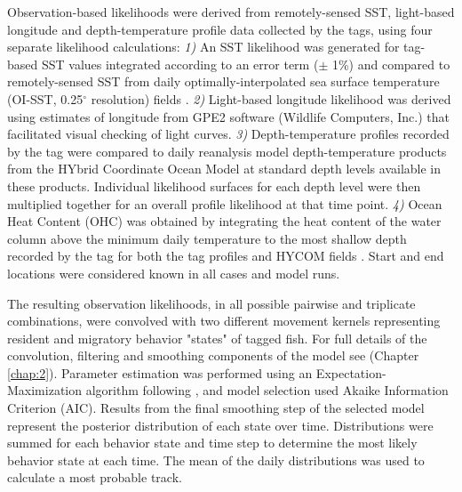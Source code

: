 Observation-based likelihoods were derived from remotely-sensed SST, light-based longitude and depth-temperature profile data collected by the tags, using four separate likelihood calculations: \emph{1)} An SST likelihood was generated for tag-based SST values integrated according to an error term (\(\pm\) 1\%) and compared to remotely-sensed SST from daily optimally-interpolated sea surface temperature (OI-SST, 0.25$^{\circ}$ resolution) fields \citep{Reynolds2007, Banzon2016}. \emph{2)} Light-based longitude likelihood was derived using estimates of longitude from GPE2 software (Wildlife Computers, Inc.) that facilitated visual checking of light curves. \emph{3)} Depth-temperature profiles recorded by the tag were compared to daily reanalysis model depth-temperature products from the HYbrid Coordinate Ocean Model \citep[HYCOM, 0.08$^{\circ}$ resolution;][]{Bleck2002, Chassignet2007} at standard depth levels available in these products. Individual likelihood surfaces for each depth level were then multiplied together for an overall profile likelihood at that time point. \emph{4)} Ocean Heat Content (OHC) was obtained by integrating the heat content of the water column above the minimum daily temperature to the most shallow depth recorded by the tag for both the tag profiles and HYCOM fields \citep{Luo2015, Braun2018a}. Start and end locations were considered known in all cases and model runs.

The resulting observation likelihoods, in all possible pairwise and triplicate combinations, were convolved with two different movement kernels representing resident and migratory behavior "states" of tagged fish. For full details of the convolution, filtering and smoothing components of the model see \citet{Braun2018a} (Chapter \ref{chap:2}). Parameter estimation was performed using an Expectation-Maximization algorithm following \citet{Woillez2016}, and model selection used Akaike Information Criterion (AIC). Results from the final smoothing step of the selected model represent the posterior distribution of each state over time. Distributions were summed for each behavior state and time step to determine the most likely behavior state at each time. The mean of the daily distributions was used to calculate a most probable track.

